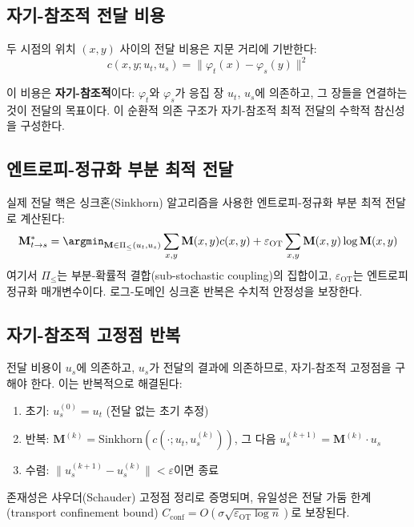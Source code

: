 \subsection{자기-참조적 전달 비용}

두 시점의 위치 $(x, y)$ 사이의 전달 비용은 지문 거리에 기반한다:
\begin{equation}
    c(x, y; u_t, u_s) = \|\varphi_t(x) - \varphi_s(y)\|^2
    \label{eq:transport-cost}
\end{equation}

이 비용은 \textbf{자기-참조적}이다: $\varphi_t$와 $\varphi_s$가 응집 장 $u_t$, $u_s$에 의존하고, 그 장들을 연결하는 것이 전달의 목표이다. 이 순환적 의존 구조가 자기-참조적 최적 전달의 수학적 참신성을 구성한다.

\subsection{엔트로피-정규화 부분 최적 전달}

실제 전달 핵은 싱크혼(Sinkhorn) 알고리즘을 사용한 엔트로피-정규화 부분 최적 전달로 계산된다:
\begin{equation}
    \mathbf{M}^*_{t \to s} = \argmin_{\mathbf{M} \in \Pi_\leq(u_t, u_s)} \sum_{x,y} \mathbf{M}(x,y) c(x,y) + \varepsilon_{\mathrm{OT}} \sum_{x,y} \mathbf{M}(x,y) \log \mathbf{M}(x,y)
\end{equation}
여기서 $\Pi_\leq$는 부분-확률적 결합(sub-stochastic coupling)의 집합이고, $\varepsilon_{\mathrm{OT}}$는 엔트로피 정규화 매개변수이다. 로그-도메인 싱크혼 반복은 수치적 안정성을 보장한다.

\subsection{자기-참조적 고정점 반복}

전달 비용이 $u_s$에 의존하고, $u_s$가 전달의 결과에 의존하므로, 자기-참조적 고정점을 구해야 한다. 이는 반복적으로 해결된다:

\begin{enumerate}
    \item 초기: $u_s^{(0)} = u_t$ (전달 없는 초기 추정)
    \item 반복: $\mathbf{M}^{(k)} = \text{Sinkhorn}(c(\cdot; u_t, u_s^{(k)}))$, 그 다음 $u_s^{(k+1)} = \mathbf{M}^{(k)} \cdot u_s$
    \item 수렴: $\|u_s^{(k+1)} - u_s^{(k)}\| < \varepsilon$이면 종료
\end{enumerate}

존재성은 샤우더(Schauder) 고정점 정리로 증명되며, 유일성은 전달 가둠 한계(transport confinement bound) $C_{\mathrm{conf}} = O(\sigma\sqrt{\varepsilon_{\mathrm{OT}} \log n})$로 보장된다.

